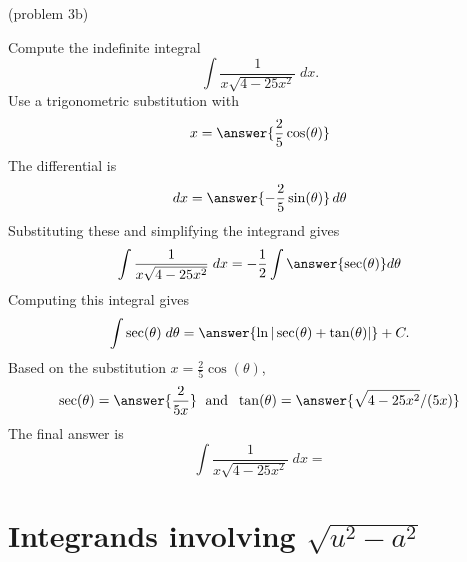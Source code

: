 \documentclass{ximera}
\begin{document}
\begin{problem}(problem 3b)

Compute the indefinite integral
\[
\int \frac{1}{x\sqrt{4-25x^2}}  \; dx.
\]
Use a trigonometric substitution with\\
\[
x = \answer{\frac25\cos(\theta)}
\]
The differential is\\
\[
dx = \answer{-\frac25\sin(\theta)}\,d\theta
\]
Substituting these and simplifying the integrand gives\\
\[
\int \frac{1}{x\sqrt{4-25x^2}}  \; dx = -\frac12\int \answer{\sec(\theta)} d\theta
\]
Computing this integral gives
\[
\int \sec(\theta) \; d\theta = \answer{\ln|\sec(\theta) + \tan(\theta)|} + C.
\]
Based on the substitution $x = \frac25 \cos(\theta)$, \\
\[
\sec(\theta) = \answer{\frac{2}{5x}} \; \text{ and } \; \tan(\theta) = \answer{\sqrt{4-25x^2}/(5x)}
\]
The final answer is
\[
\int  \frac{1}{x\sqrt{4-25x^2}} \; dx = 
\]
\begin{center}
\begin{multipleChoice}
\end{multipleChoice}
\end{center}


\end{problem}

















\section{Integrands involving $\sqrt{u^2 - a^2}$}
\end{document}
